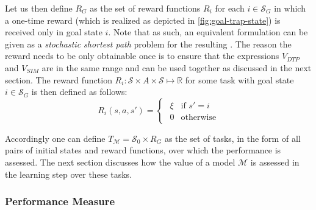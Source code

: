 Let us then define $R_G$ as the set of reward functions $R_i$ for each $i \in \mathcal{S}_G$ in which a one-time reward (which is realized as depicted in \autoref{fig:goal-trap-state}) is received only in goal state $i$.
Note that as such, an equivalent formulation can be given as a \textit{stochastic shortest path} problem \cite{GuillotS17} for the resulting .
The reason the reward needs to be only obtainable once is to ensure that the expressions $V_\mathit{DTP}$ and $V_\mathit{SIM}$ are in the same range and can be used together as discussed in the next section.
The reward function $R_i: \mathcal{S} \times A \times \mathcal{S} \mapsto \mathbb{R}$ for some task with goal state $i \in \mathcal{S}_G$ is then defined as follows:
\begin{equation}
R_i(s, a, s') = 
\begin{cases}
\hspace{4pt} \xi & \text{if } s' = i \\
\hspace{4pt} 0 & \text{otherwise}
\end{cases}
\end{equation}

Accordingly one can define $T_{\mathcal{M}} = \mathcal{S_0} \times R_G$ as the set of tasks, in the form of all pairs of initial states and reward functions, over which the performance is assessed.
The next section discusses how the value of a model $\mathcal{M}$ is assessed in the learning step over these tasks.

\newpage %

\subsubsection{Performance Measure}


